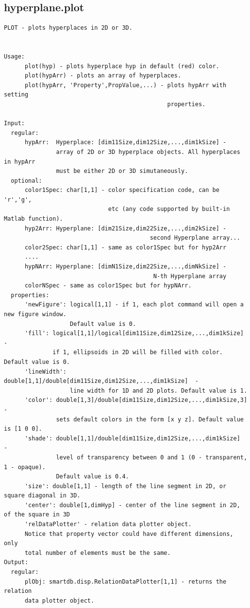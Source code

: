 \documentclass[letterpaper,10pt,english]{sphinxmanual}
\begin{document}
\subsection{hyperplane.plot}
\label{chap_functions:hyperplane-plot}
\begin{Verbatim}[commandchars=\\\{\}]
PLOT - plots hyperplaces in 2D or 3D.


Usage:
      plot(hyp) - plots hyperplace hyp in default (red) color.
      plot(hypArr) - plots an array of hyperplaces.
      plot(hypArr, 'Property',PropValue,...) - plots hypArr with setting
                                               properties.

Input:
  regular:
      hypArr:  Hyperplace: [dim11Size,dim12Size,...,dim1kSize] -
               array of 2D or 3D hyperplace objects. All hyperplaces in hypArr
               must be either 2D or 3D simutaneously.
  optional:
      color1Spec: char[1,1] - color specification code, can be 'r','g',
                              etc (any code supported by built-in Matlab function).
      hyp2Arr: Hyperplane: [dim21Size,dim22Size,...,dim2kSize] -
                                          second Hyperplane array...
      color2Spec: char[1,1] - same as color1Spec but for hyp2Arr
      ....
      hypNArr: Hyperplane: [dimN1Size,dim22Size,...,dimNkSize] -
                                           N-th Hyperplane array
      colorNSpec - same as color1Spec but for hypNArr.
  properties:
      'newFigure': logical[1,1] - if 1, each plot command will open a new figure window.
                   Default value is 0.
      'fill': logical[1,1]/logical[dim11Size,dim12Size,...,dim1kSize]  -
              if 1, ellipsoids in 2D will be filled with color. Default value is 0.
      'lineWidth': double[1,1]/double[dim11Size,dim12Size,...,dim1kSize]  -
                   line width for 1D and 2D plots. Default value is 1.
      'color': double[1,3]/double[dim11Size,dim12Size,...,dim1kSize,3] -
               sets default colors in the form [x y z]. Default value is [1 0 0].
      'shade': double[1,1]/double[dim11Size,dim12Size,...,dim1kSize]  -
               level of transparency between 0 and 1 (0 - transparent, 1 - opaque).
               Default value is 0.4.
      'size': double[1,1] - length of the line segment in 2D, or square diagonal in 3D.
      'center': double[1,dimHyp] - center of the line segment in 2D, of the square in 3D
      'relDataPlotter' - relation data plotter object.
      Notice that property vector could have different dimensions, only
      total number of elements must be the same.
Output:
  regular:
      plObj: smartdb.disp.RelationDataPlotter[1,1] - returns the relation
      data plotter object.
\end{Verbatim}
\end{document}
